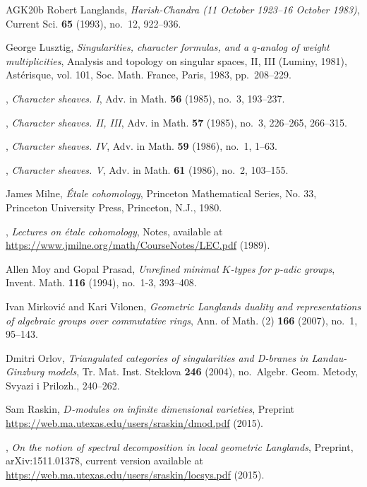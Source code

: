 \begin{thebibliography}{AGK{\etalchar{+}}20b}
Robert Langlands, \emph{Harish-{C}handra (11 {O}ctober 1923--16 {O}ctober
  1983)}, Current Sci. \textbf{65} (1993), no.~12, 922--936.

George Lusztig, \emph{Singularities, character formulas, and a {$q$}-analog of
  weight multiplicities}, Analysis and topology on singular spaces, {II}, {III}
  ({L}uminy, 1981), Ast\'{e}risque, vol. 101, Soc. Math. France, Paris, 1983,
  pp.~208--229.

\bysame, \emph{Character sheaves. {I}}, Adv. in Math. \textbf{56} (1985),
  no.~3, 193--237.

\bysame, \emph{Character sheaves. {II}, {III}}, Adv. in Math. \textbf{57}
  (1985), no.~3, 226--265, 266--315.

\bysame, \emph{Character sheaves. {IV}}, Adv. in Math. \textbf{59} (1986),
  no.~1, 1--63.

\bysame, \emph{Character sheaves. {V}}, Adv. in Math. \textbf{61} (1986),
  no.~2, 103--155.

James Milne, \emph{\'{E}tale cohomology}, Princeton Mathematical Series, No.
  33, Princeton University Press, Princeton, N.J., 1980.

\bysame, \emph{Lectures on \'{e}tale cohomology}, Notes, available at
  \url{https://www.jmilne.org/math/CourseNotes/LEC.pdf} (1989).

Allen Moy and Gopal Prasad, \emph{Unrefined minimal {$K$}-types for {$p$}-adic
  groups}, Invent. Math. \textbf{116} (1994), no.~1-3, 393--408.

Ivan Mirkovi{\'c} and Kari Vilonen, \emph{Geometric {L}anglands duality and
  representations of algebraic groups over commutative rings}, Ann. of Math.
  (2) \textbf{166} (2007), no.~1, 95--143.

Dmitri Orlov, \emph{Triangulated categories of singularities and {D}-branes in
  {L}andau-{G}inzburg models}, Tr. Mat. Inst. Steklova \textbf{246} (2004),
  no.~Algebr. Geom. Metody, Svyazi i Prilozh., 240--262.

Sam Raskin, \emph{{$D$}-modules on infinite dimensional varieties}, Preprint
  \url{https://web.ma.utexas.edu/users/sraskin/dmod.pdf} (2015).

\bysame, \emph{On the notion of spectral decomposition in local geometric
  {L}anglands}, Preprint, arXiv:1511.01378, current version available at
  \url{https://web.ma.utexas.edu/users/sraskin/locsys.pdf} (2015).


\end{thebibliography}
